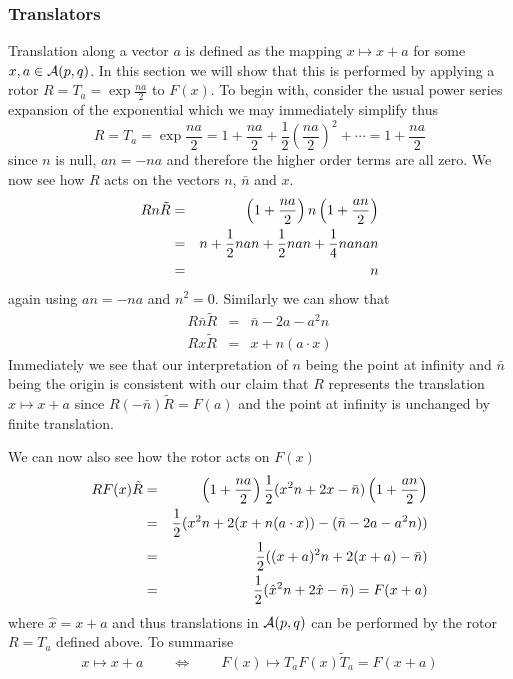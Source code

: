 \subsubsection{Translators}

Translation along a vector $a$ is defined as the
mapping $x\mapsto x+a$ for some $x,a \in \mathcal{A}(p,q)$. In this
section we will show that this is performed by applying a 
rotor $R=T_a = \exp{\frac{na}{2}}$ to $F(x)$.
To begin with, consider the usual power series expansion of the exponential
which we may immediately simplify thus
%
\begin{equation}
R=T_a = \exp{\frac{na}{2}} = 1 + \frac{na}{2} +
\frac{1}{2}\left(\frac{na}{2}\right)^2 + \cdots   = 1 +
\frac{na}{2}
\end{equation}
%
since $n$ is null, $an = -na$ and therefore the higher order terms are all
zero. We now see how $R$ acts on the vectors $n$, $\bar{n}$ and $x$.
%
\begin{eqnarray}
 Rn\tilde{R} & = & \left(1 + \frac{na}{2}\right)n\left(1 + \frac{an}{2}\right) \nonumber \\
                & = &  n + \frac{1}{2}nan + \frac{1}{2}nan + \frac{1}{4}nanan \nonumber \\
                & = & n
                \label{rntrans}
\end{eqnarray}
%
again using  $an= - na$ and $n^2=0$.    Similarly we can
show that
%
\begin{eqnarray}
 R\bar{n}\tilde{R} & = &  \bar{n}  - 2a - a^2n \\
 Rx\tilde{R}          & = &  x + n(a\cdot x)
\end{eqnarray}
%
Immediately we see that our interpretation of $n$ being the point at
infinity and $\bar{n}$ being the origin is consistent with our claim that
$R$ represents the translation $x \mapsto x+a$ since $R(-\bar{n})\tilde{R} = F(a)$
and the point at infinity is unchanged by finite translation.

We can now also see how the rotor acts on $F(x)$
%
\begin{eqnarray}
RF(x)\tilde{R} & = & \left(1 + \frac{na}{2}\right)\frac{1}{2}(x^2n + 2x - \bar{n})\left(1 + \frac{an}{2}\right) \nonumber \\
                & = &  \frac{1}{2}(x^2n + 2(x + n(a\cdot x)) - (\bar{n} - 2a - a^2n))   \nonumber \\
                & = &  \frac{1}{2}((x+a)^2n + 2(x+a) - \bar{n}) \nonumber \\
                & = &  \frac{1}{2}(\hat{x}^2 n + 2\hat{x} - \bar{n}) = F(x+a)
\end{eqnarray}
%
where $\hat{x}=x+a$ and thus translations in
${\mathcal{A}}(p,q)$ can be performed by the
rotor  $R=T_a$ defined above. To summarise
 \begin{equation}
x \mapsto x+a \qquad \Leftrightarrow \qquad F(x) \mapsto T_a
F(x) \tilde{T}_a = F(x+a)
\end{equation}

